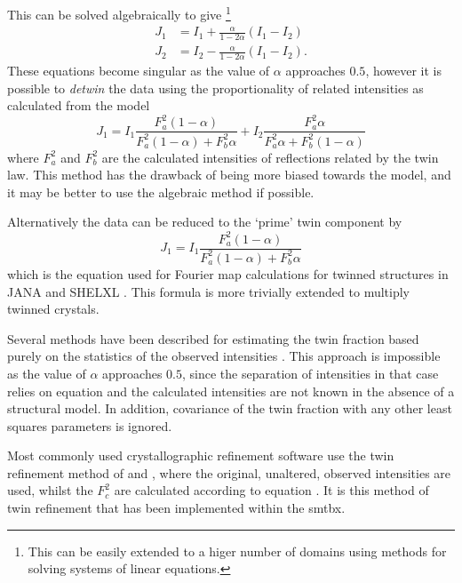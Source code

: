 \documentclass[pdf]{iucr}
\begin{document}
This can be solved algebraically \cite{Britton:a08682,Grainger:a06498,Zachariasen:a04610} to give
\footnote{This can be easily extended to a higer number of domains using methods for solving systems of linear equations.}
\begin{align}
J_1 &= I_1 + \frac{\alpha}{1 - 2 \alpha} (I_1 - I_2) \\
J_2 &= I_2 - \frac{\alpha}{1 - 2 \alpha} (I_1 - I_2)
.
\label{eqn:detwin_alg}
\end{align}
These equations become singular as the value of $\alpha$ approaches $0.5$, however it is possible to \emph{detwin} the data using the proportionality of related intensities as calculated from the model
\begin{equation}
J_1 = I_1 \frac{F_a^2 (1 - \alpha)}{F_a^2 (1 - \alpha) + F_b^2 \alpha} + I_2 \frac{F_a^2 \alpha}{F_a^2 \alpha + F_b^2 (1 - \alpha)}
\label{eqn:detwin_prop}
\end{equation}
where $F_a^2$ and $F_b^2$ are the calculated intensities of reflections related by the twin law. This method has the drawback of being more biased towards the model, and it may be better to use the algebraic method if possible.

Alternatively the data can be reduced to the `prime' twin component by
\begin{equation}
J_1 = I_1 \frac{F_a^2 (1 - \alpha)}{F_a^2 (1 - \alpha) + F_b^2 \alpha}
\label{eqn:detwin_prime}
\end{equation}
which is the equation used for Fourier map calculations for twinned structures in JANA \cite{JANA:man98,Dusek:hn0119} and SHELXL \cite{SHELX:man97}. This formula is more trivially extended to multiply twinned crystals.

Several methods have been described for estimating the twin fraction based purely on the statistics of the observed intensities \cite{Britton:a08682,Murray-Rust:a10328}. This approach is impossible as the value of $\alpha$ approaches $0.5$, since the separation of intensities in that case relies on equation  and the calculated intensities are not known in the absence of a structural model. In addition, covariance of the twin fraction with any other least squares parameters is ignored.

Most commonly used crystallographic refinement software \cite{Sheldrick:sc5010,Betteridge:os5005} use the twin refinement method of \cite{Jameson:a20747} and \cite{J19710002146}, where the original, unaltered, observed intensities are used, whilst the $F_c^2$ are calculated according to equation . It is this method of twin refinement that has been implemented within the smtbx.
\end{document}
